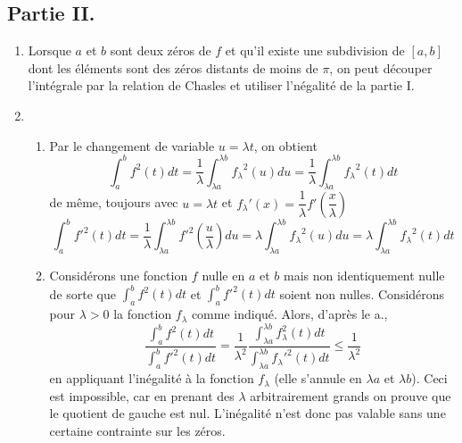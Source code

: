 \subsection*{Partie II.}
\begin{enumerate}
 \item Lorsque $a$ et $b$ sont deux zéros de $f$ et qu'il existe une subdivision de $[a,b]$ dont les éléments sont des zéros distants de moins de $\pi$, on peut découper l'intégrale par la relation de Chasles et utiliser l'négalité de la partie I.
 \item \begin{enumerate}
\item Par le changement de variable $u=\lambda t$, on obtient
\begin{displaymath}
 \int_a^bf^2(t)dt
=\dfrac{1}{\lambda}\int_{\lambda a}^{\lambda b}{f_\lambda}^2(u)du
=\dfrac{1}{\lambda}\int_{\lambda a}^{\lambda b}{f_\lambda}^2(t)dt
\end{displaymath}
de même, toujours avec $u=\lambda t$ et ${f_\lambda}'(x)=\dfrac{1}{\lambda}f'(\dfrac{x}{\lambda})$
\begin{displaymath}
 \int_a^bf'^2(t)dt
=\dfrac{1}{\lambda}\int_{\lambda a}^{\lambda b}{f'}^2(\dfrac{u}{\lambda})du
=\lambda\int_{\lambda a}^{\lambda b}{f_\lambda}^2(u)du
=\lambda\int_{\lambda a}^{\lambda b}{f_\lambda}^2(t)dt
\end{displaymath}
\item Considérons une fonction $f$ nulle en $a$ et $b$ mais non identiquement nulle de sorte que $\int_a^bf^2(t)dt$ et $\int_a^bf'^2(t)dt$ soient non nulles. Considérons pour $\lambda>0$ la fonction $f_\lambda$ comme indiqué. Alors, d'après le a.,
\begin{displaymath}
 \dfrac{\int_a^bf^2(t)dt}{\int_a^bf'^2(t)dt}
=\dfrac{1}{\lambda^2}
\dfrac{\int_{\lambda a}^{\lambda b}f_\lambda^2(t)dt}{\int_{\lambda a}^{\lambda b}{f_\lambda}'^2(t)dt}
\leq \dfrac{1}{\lambda^2}
\end{displaymath}
en appliquant l'inégalité à la fonction $f_\lambda$ (elle s'annule en $\lambda a$ et $\lambda b$).\newline
Ceci est impossible, car en prenant des $\lambda$ arbitrairement grands on prouve que le quotient de gauche est nul.\newline
L'inégalité n'est donc pas valable sans une certaine contrainte sur les zéros.
\end{enumerate}
\end{enumerate}

